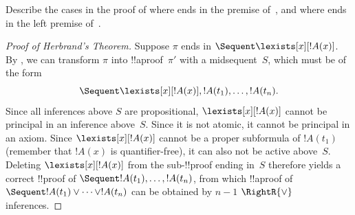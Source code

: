 \documentclass[../../../include/open-logic-section]{subfiles}
\begin{document}
\begin{prob}
Describe the cases in the proof of  where
\LeftR{\lexists} ends in the premise of~\RightR{\lif}, and where
\LeftR{\lforall} ends in the left premise of~\LeftR{\lor}.
\end{prob}

\begin{proof}[Proof of Herbrand's Theorem]
Suppose $\pi$ ends in $\Sequent \lexists[x][!A(x)]$. By
, we can transform $\pi$ into !!a{proof}~$\pi'$
with a midsequent~$S$, which must be of the form \[\Sequent
\lexists[x][!A(x)], !A(t_1), \dots, !A(t_n).\] Since all inferences
above $S$ are propositional, $\lexists[x][!A(x)]$ cannot be principal
in an inference above~$S$. Since it is not atomic, it cannot be
principal in an axiom. Since $\lexists[x][!A(x)]$ cannot be a proper
subformula of $!A(t_1)$ (remember that $!A(x)$ is quantifier-free), it
can also not be active above~$S$. Deleting $\lexists[x][!A(x)]$ from
the sub-!!{proof} ending in~$S$ therefore yields a correct !!{proof}
of $\Sequent !A(t_1), \dots, !A(t_n)$, from which !!a{proof} of
$\Sequent !A(t_1) \lor \dots \lor !A(t_n)$ can be obtained by $n-1$
$\RightR{\lor}$ inferences.
\end{proof}

\end{document}
